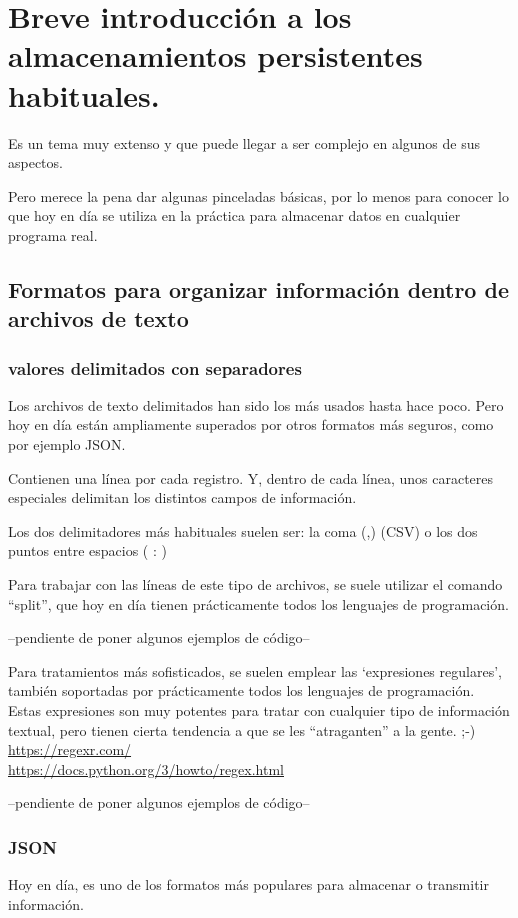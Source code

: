 \documentclass[spanish,12pt,a4paper,final,oneside]{book}
\begin{document}
\chapter{Breve introducción a los almacenamientos persistentes habituales.}
Es un tema muy extenso y que puede llegar a ser complejo en algunos de sus aspectos.

Pero merece la pena dar algunas pinceladas básicas, por lo menos para conocer lo que hoy en día se utiliza en la práctica para almacenar datos en cualquier programa real.

\section{Formatos para organizar información dentro de  archivos de texto}


\subsection{valores delimitados con separadores}
Los archivos de texto delimitados han sido los más usados hasta hace poco. Pero hoy en día están ampliamente superados por otros formatos más seguros, como por ejemplo JSON.

Contienen una línea por cada registro. Y, dentro de cada línea, unos caracteres especiales delimitan los distintos campos de información.

Los dos delimitadores más habituales suelen ser: la coma (,) (CSV)  o  los dos puntos entre espacios ( : )

Para trabajar con las líneas de este tipo de archivos, se suele utilizar el comando ``split'', que hoy en día tienen prácticamente todos los lenguajes de programación.

--pendiente de poner algunos ejemplos de código--

Para tratamientos más sofisticados, se suelen emplear las `expresiones regulares', también soportadas por prácticamente todos los lenguajes de programación.
\\Estas expresiones son muy potentes para tratar con cualquier tipo de información textual, pero tienen cierta tendencia a que se les ``atraganten'' a la gente.  ;-)
\\ \url{https://regexr.com/}
\\ \url{https://docs.python.org/3/howto/regex.html}

--pendiente de poner algunos ejemplos de código--


\subsection{JSON}
Hoy en día, es uno de los formatos más populares para almacenar o transmitir información.
\end{document}

